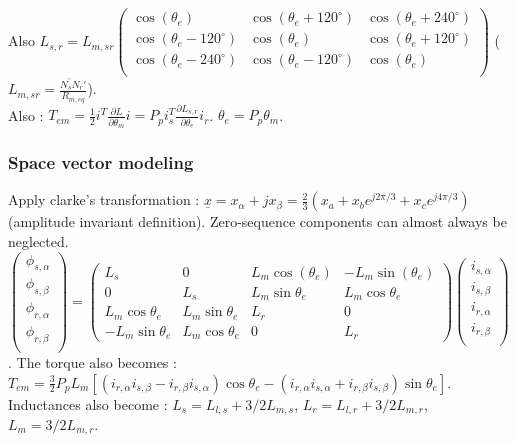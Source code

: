 \documentclass[../main.tex]{subfiles}
\begin{document}
Also $L_{s,r} = L_{m,sr} \begin{pmatrix}
    \cos(\theta_e) & \cos(\theta_e+120^\circ) & \cos(\theta_e+240^\circ)\\ \cos(\theta_e-120^\circ) & \cos(\theta_e) & \cos(\theta_e+120^\circ)\\ \cos(\theta_e-240^\circ) & \cos(\theta_e-120^\circ) & \cos(\theta_e)\\
\end{pmatrix}$ ($L_{m,sr} = \frac{N_s^{'} N_r'}{R_{m,eq}}$).\\

Also : $T_{em} = \frac{1}{2}i^T \frac{\partial L}{\partial \theta_m} i = P_p i_s^T \frac{\partial L_{s,r}}{\partial \theta_e} i_r$. $\theta_e = P_p \theta_m$.\\

\subsubsection{Space vector modeling}
Apply clarke's transformation : $\underline{x} = x_\alpha + jx_\beta = \frac{2}{3}(x_a + x_b e^{j2\pi/3} + x_c e^{j4\pi/3})$ (amplitude invariant definition). \warning Zero-sequence components can almost always be neglected.\\

$\begin{pmatrix}
    \phi_{s,\alpha}\\ \phi_{s,\beta} \\ \phi_{r,\alpha} \\ \phi_{r,\beta}\\
\end{pmatrix} = \begin{pmatrix}
    L_s & 0 & L_m \cos(\theta_e) & -L_m \sin(\theta_e)\\ 0 & L_s & L_m\sin \theta_e & L_m \cos \theta_e\\ L_m \cos \theta_e & L_m \sin \theta_e & L_r & 0\\ -L_m \sin \theta_e & L_m \cos \theta_e & 0 &L_r
\end{pmatrix} \begin{pmatrix}
     i_{s,\alpha}\\ i_{s,\beta} \\ i_{r,\alpha} \\ i_{r,\beta}\\
\end{pmatrix}$. The torque also becomes : $T_{em} = \frac{3}{2} P_p L_m [(i_{r,\alpha} i_{s,\beta} - i_{r,\beta} i_{s,\alpha})\cos\theta_e - (i_{r,\alpha} i_{s,\alpha} + i_{r,\beta} i_{s,\beta})\sin\theta_e]$. Inductances also become : $L_s= L_{l,s} + 3/2 L_{m,s}$, $L_r = L_{l,r} + 3/2 L_{m,r}$, $L_m = 3/2 L_{m,r}$.\\
\end{document}
